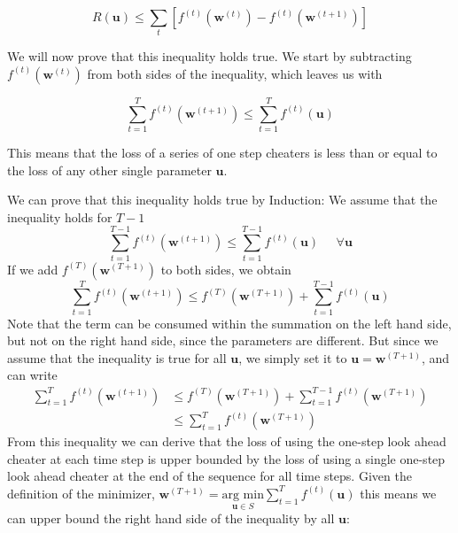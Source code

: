 \documentclass[11pt]{article}
\begin{document}
\begin{equation*}
    R(\boldsymbol{u})\leq \sum_t [f^{(t)}(\boldsymbol{w}^{(t)})-f^{(t)} (\boldsymbol{w}^{(t+1)})]
\end{equation*}

We will now prove that this inequality holds true. We start by subtracting $f^{(t)}(\boldsymbol{w}^{(t)})$ from both sides of the inequality, which leaves us with 


\begin{equation*}
    \sum_{t=1}^T f^{(t)} (\boldsymbol{w}^{(t+1)})\leq  \sum_{t=1}^T f^{(t)} (\boldsymbol{u})
\end{equation*}


This means that the loss of a series of one step cheaters is less than or equal to the loss of any other single parameter $\boldsymbol{u}$.

We can prove that this inequality holds true by Induction: 
We assume that the inequality holds for $T-1$
\begin{equation*}
    \sum_{t=1}^{T-1} f^{(t)} (\boldsymbol{w}^{(t+1)})\leq  \sum_{t=1}^{T-1} f^{(t)} (\boldsymbol{u}) \;\;\;\;\; \forall \boldsymbol{u}
\end{equation*}
If we add $f^{(T)}(\boldsymbol{w}^{(T+1)})$ to both sides, we obtain
\begin{equation*}
    \sum_{t=1}^{T} f^{(t)} (\boldsymbol{w}^{(t+1)})\leq f^{(T)}(\boldsymbol{w}^{(T+1)}) +  \sum_{t=1}^{T-1} f^{(t)} (\boldsymbol{u}) 
\end{equation*}
Note that the term can be consumed within the summation on the left hand side, but not on the right hand side, since the parameters are different. But since we assume that the inequality is true for all $\boldsymbol{u}$, we simply set it to $\boldsymbol{u}=\boldsymbol{w}^{(T+1)}$, and can write
\begin{align*}
       \sum_{t=1}^{T} f^{(t)} (\boldsymbol{w}^{(t+1)})&\leq f^{(T)}(\boldsymbol{w}^{(T+1)}) +  \sum_{t=1}^{T-1} f^{(t)} (\boldsymbol{w}^{(T+1)})\\
       &\leq \sum_{t=1}^{T} f^{(t)} (\boldsymbol{w}^{(T+1)})
\end{align*}
From this inequality we can derive that the loss of using the one-step look ahead cheater at each time step is upper bounded by the loss of using a single one-step look ahead cheater at the end of the sequence for all time steps. Given the definition of the minimizer, $\boldsymbol{w}^{(T+1)}= \underset{\boldsymbol{u}\in S}{\text{arg min}} \sum_{t=1}^T f^{(t)} (\boldsymbol{u})$
this means we can upper bound the right hand side of the inequality by all $\boldsymbol{u}$:
\end{document}
